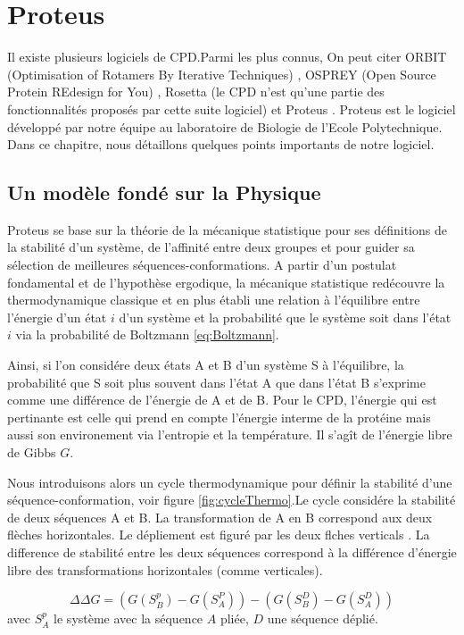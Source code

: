 \chapter{Proteus}
\label{chap:methodes}

Il existe plusieurs logiciels de CPD.Parmi les plus connus, On peut citer ORBIT (Optimisation of Rotamers By Iterative Techniques) \cite{Dahiyat96}, OSPREY (Open Source Protein REdesign for You) \cite{Gainza13}, Rosetta (le CPD n'est qu'une partie des fonctionnalités proposés par cette suite logiciel) \cite{Kuhlman03} et Proteus \cite{Simonson13}. Proteus est le logiciel développé par notre équipe au laboratoire de Biologie de l'Ecole Polytechnique. Dans ce chapitre, nous détaillons quelques points importants de notre logiciel.  

\section{Un modèle fondé sur la Physique}
\label{sec:Phy}
Proteus se base sur la théorie de la mécanique statistique pour ses définitions de la stabilité d'un système, de l'affinité entre deux groupes et pour guider sa sélection de meilleures séquences-conformations. A partir d'un postulat fondamental et de l'hypothèse ergodique, la mécanique statistique \og redécouvre \fg la thermodynamique classique et en plus établi une relation à l'équilibre entre l'énergie d'un état $i$ d'un système et la probabilité que le système soit dans l'état $i$ via la probabilité de Boltzmann \ref{eq:Boltzmann}.

Ainsi, si l'on considére deux états A et B d'un système S à l'équilibre, la probabilité que S soit plus souvent dans l'état A que dans l'état B s'exprime comme une différence de l'énergie de A et de B. Pour le CPD, l'énergie qui est pertinante est celle qui prend en compte l'énergie interme de la protéine mais aussi son environement via l'entropie et la température. Il s'agît de l'énergie libre de Gibbs $G$.

Nous introduisons alors un cycle thermodynamique pour définir la stabilité d'une séquence-conformation, voir figure \ref{fig:cycleThermo}.Le cycle considére la stabilité de deux séquences A et B. La transformation de A en B correspond aux deux flèches horizontales. Le dépliement est figuré par les deux flches verticals . La difference de stabilité entre les deux séquences correspond à la différence d'énergie libre des transformations horizontales (comme verticales).

\begin{equation}
  \label{deltaG}
\Delta \Delta G = (G(S^p_B)- G(S^P_A)) - (G(S^D_B)- G(S^D_A))
\end{equation}  
avec $S^p_A$ le système avec la séquence $A$ pliée, $D$ une séquence déplié.

